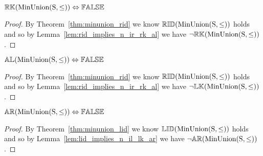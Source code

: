 \begin{theorem} \label{thm:minunion_rk}
${\mathbb{RK}}(\mathrm{MinUnion(S,\leq)}) \Leftrightarrow {\mathbb{FALSE}}$
\end{theorem}

\begin{proof}

\vspace{0.5em}

By Theorem~\ref{thm:minunion_rid} we know ${\mathbb{RID}}(\mathrm{MinUnion(S,\leq)})$ holds and so by Lemma~\ref{lem:rid_implies_n_ir_rk_al} we have $\neg {\mathbb{RK}}(\mathrm{MinUnion(S,\leq)})$.
\end{proof}






\begin{theorem} \label{thm:minunion_al}
${\mathbb{AL}}(\mathrm{MinUnion(S,\leq)}) \Leftrightarrow {\mathbb{FALSE}}$
\end{theorem}

\begin{proof}

\vspace{0.5em}

By Theorem~\ref{thm:minunion_rid} we know ${\mathbb{RID}}(\mathrm{MinUnion(S,\leq)})$ holds and so by Lemma~\ref{lem:rid_implies_n_ir_rk_al} we have $\neg {\mathbb{LK}}(\mathrm{MinUnion(S,\leq)})$.
\end{proof}





\begin{theorem} \label{thm:minunion_ar}
${\mathbb{AR}}(\mathrm{MinUnion(S,\leq)}) \Leftrightarrow {\mathbb{FALSE}}$
\end{theorem}

\begin{proof}

\vspace{0.5em}

By Theorem~\ref{thm:minunion_lid} we know ${\mathbb{LID}}(\mathrm{MinUnion(S,\leq)})$ holds and so by Lemma~\ref{lem:lid_implies_n_il_lk_ar} we have $\neg {\mathbb{AR}}(\mathrm{MinUnion(S,\leq)})$.
\end{proof}
